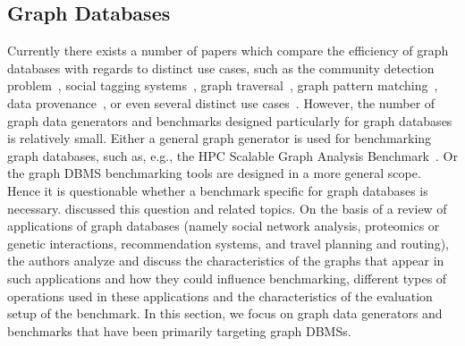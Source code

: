 \subsection{Graph Databases}
\label{sec:generators_GraphDatabases}

Currently there exists a number  of papers which compare the efficiency of graph databases with regards to distinct use cases, such as  the community detection problem~\cite{Beis2015}, social tagging systems~\cite{Giatsoglou2011}, graph traversal~\cite{Ciglan:2012:BTO:2374486.2375242}, graph pattern matching~\cite{Pobiedina2014}, data provenance~\cite{Vicknair:2010:CGD:1900008.1900067}, or even several distinct use cases~\cite{Grossniklaus2013Towar-24253}. However, the number of graph data generators and benchmarks designed particularly for graph databases is relatively small. Either a general graph generator is used for benchmarking graph databases, such as, e.g., the HPC Scalable Graph Analysis Benchmark~\cite{Dominguez-Sal:2010:SGD:1927585.1927590}. Or the graph DBMS benchmarking tools are designed in a more general scope. Hence it is questionable whether a benchmark specific for graph databases is necessary. \cite{Dominguez-Sal:2010:DDG:1946050.1946053} discussed this question and related topics. On the basis of a review of applications of graph databases (namely social network analysis, proteomics or genetic interactions, recommendation systems, and travel planning and routing), the authors analyze and discuss the characteristics of the graphs that appear in such applications and how they could influence benchmarking, different types of operations used in these applications and the characteristics of the evaluation setup of the benchmark. In this section, we focus on graph data generators and benchmarks that have been primarily targeting graph DBMSs.


